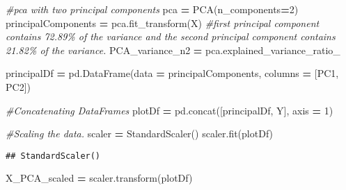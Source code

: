 \documentclass[
]{article}
\newenvironment{Shaded}{\begin{snugshade}}{\end{snugshade}}
\newcommand{\CommentTok}[1]{\textcolor[rgb]{0.56,0.35,0.01}{\textit{#1}}}
\newcommand{\DecValTok}[1]{\textcolor[rgb]{0.00,0.00,0.81}{#1}}
\newcommand{\NormalTok}[1]{#1}
\newcommand{\OperatorTok}[1]{\textcolor[rgb]{0.81,0.36,0.00}{\textbf{#1}}}
\newcommand{\StringTok}[1]{\textcolor[rgb]{0.31,0.60,0.02}{#1}}
\begin{document}
\begin{Shaded}
\begin{Highlighting}[]
\CommentTok{\#pca with two principal components}
\NormalTok{pca }\OperatorTok{=}\NormalTok{ PCA(n\_components}\OperatorTok{=}\DecValTok{2}\NormalTok{)}
\NormalTok{principalComponents }\OperatorTok{=}\NormalTok{ pca.fit\_transform(X)}
\CommentTok{\#first principal component contains 72.89\% of the variance and the second principal component contains 21.82\% of the variance. }
\NormalTok{PCA\_variance\_n2 }\OperatorTok{=}\NormalTok{ pca.explained\_variance\_ratio\_ }

\NormalTok{principalDf }\OperatorTok{=}\NormalTok{ pd.DataFrame(data }\OperatorTok{=}\NormalTok{ principalComponents, columns }\OperatorTok{=}\NormalTok{ [}\StringTok{\textquotesingle{}PC1\textquotesingle{}}\NormalTok{, }\StringTok{\textquotesingle{}PC2\textquotesingle{}}\NormalTok{])}

\CommentTok{\#Concatenating DataFrames}
\NormalTok{plotDf }\OperatorTok{=}\NormalTok{ pd.concat([principalDf, Y], axis }\OperatorTok{=} \DecValTok{1}\NormalTok{)}

\CommentTok{\#Scaling the data. }
\NormalTok{scaler }\OperatorTok{=}\NormalTok{ StandardScaler()}
\NormalTok{scaler.fit(plotDf)}
\end{Highlighting}
\end{Shaded}

\begin{verbatim}
## StandardScaler()
\end{verbatim}

\begin{Shaded}
\begin{Highlighting}[]
\NormalTok{X\_PCA\_scaled }\OperatorTok{=}\NormalTok{ scaler.transform(plotDf)}
\end{Highlighting}
\end{Shaded}
\end{document}
